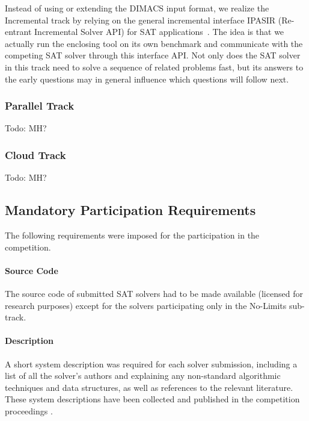\documentclass{elsarticle}
\newcommand{\todo}[1]{{\color{purple}Todo: #1}}
\begin{document}
Instead of using or extending the DIMACS input format, we realize the Incremental track
by relying on the general incremental interface IPASIR (Re-entrant Incremental Solver API) 
for SAT applications~\cite{Balyo:2015:SATRace}. The idea is that we actually run the 
enclosing tool on its own benchmark and communicate with the competing SAT solver 
through this interface API. Not only does the SAT solver in this track
need to solve a sequence of related problems fast, but its answers to the early questions
may in general influence which questions will follow next.

\subsubsection{Parallel Track}

\todo{MH?}

\subsubsection{Cloud Track}

\todo{MH?}

\subsection{Mandatory Participation Requirements}
\label{sec:rules}

The following requirements were imposed for 
the participation in the competition.

\paragraph{Source Code}
The source code of submitted SAT solvers had to be made available 
(licensed for research purposes) except for the solvers participating only in the No-Limits sub-track.

\paragraph{Description}
A short system description was required for each solver submission,
including a list of all the solver's authors and explaining any non-standard algorithmic
techniques and data structures, as well as references to the relevant literature.
These system descriptions have been collected and published in the competition
proceedings \cite{SC2020}.
\end{document}
